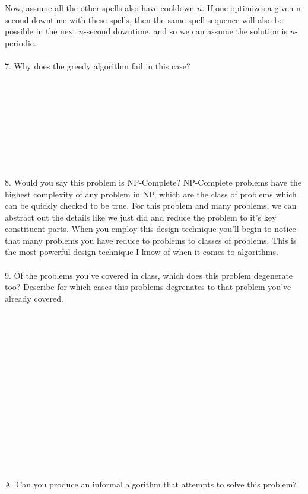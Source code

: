 \documentclass[12pt]{article}
\begin{document}
Now, assume all the other spells also have cooldown $n$. 
If one optimizes a given n-second downtime with these spells, 
then the same spell-sequence will also be possible in the next 
$n$-second downtime, and so we can assume the solution is $n$-periodic.\\\\
7. Why does the greedy algorithm fail in this case?\\\\\\\\\\\\\\\\\\\\
8. Would you say this problem is NP-Complete? NP-Complete problems have the 
highest complexity of any problem in NP, which are the class of problems which can
be quickly checked to be true.
\newpage
\noindent For this problem and many problems, we can abstract out the details like we just did
and reduce the problem to it's key constituent parts. When you employ this
design technique you'll begin to notice that many problems you have reduce to problems
to classes of problems. This is the most powerful design technique I know of when it 
comes to algorithms.\\\\
9. Of the problems you've covered in class, which does this problem degenerate too? Describe for 
which cases this problems degrenates to that problem you've already covered.\\\\\\\\\\\\\\\\\\\\\\\\\\\\\\\\
A. Can you produce an informal algorithm that attempts to solve this problem?
\newpage
\end{document}
